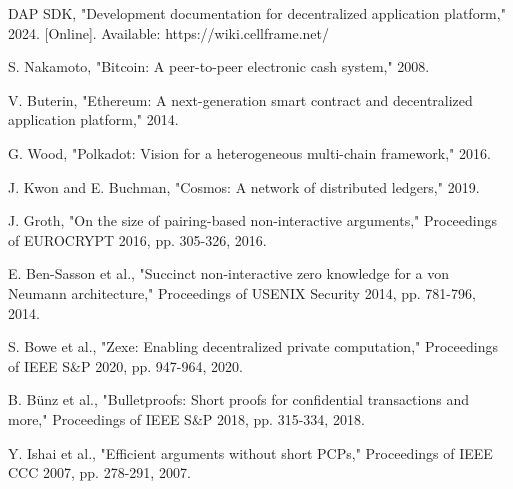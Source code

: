 \documentclass[11pt,a4paper]{article}
\begin{document}
\begin{thebibliography}{99}
DAP SDK, "Development documentation for decentralized application platform," 2024. [Online]. Available: https://wiki.cellframe.net/

S. Nakamoto, "Bitcoin: A peer-to-peer electronic cash system," 2008.

V. Buterin, "Ethereum: A next-generation smart contract and decentralized application platform," 2014.

G. Wood, "Polkadot: Vision for a heterogeneous multi-chain framework," 2016.

J. Kwon and E. Buchman, "Cosmos: A network of distributed ledgers," 2019.

J. Groth, "On the size of pairing-based non-interactive arguments," Proceedings of EUROCRYPT 2016, pp. 305-326, 2016.

E. Ben-Sasson et al., "Succinct non-interactive zero knowledge for a von Neumann architecture," Proceedings of USENIX Security 2014, pp. 781-796, 2014.

S. Bowe et al., "Zexe: Enabling decentralized private computation," Proceedings of IEEE S\&P 2020, pp. 947-964, 2020.

B. Bünz et al., "Bulletproofs: Short proofs for confidential transactions and more," Proceedings of IEEE S\&P 2018, pp. 315-334, 2018.

Y. Ishai et al., "Efficient arguments without short PCPs," Proceedings of IEEE CCC 2007, pp. 278-291, 2007.

\end{thebibliography}
\end{document}
